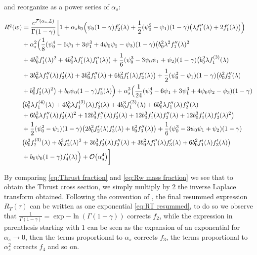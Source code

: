 \documentclass[../main.tex]{subfiles}
\begin{document}
and reorganize as a power series of $\alpha_s$:

\begin{equation}
    \begin{split}
        R^q(w) &= \frac{e^{\mathcal{F}(\alpha_s,L)}}{\Gamma(1-\gamma)} \biggl[ 1 + \alpha_s b_0 \Bigl( \psi_0(1-\gamma) f_2'(\lambda )  + \frac{1}{2} (\psi_0^2-\psi_1)(1-\gamma)\bigl( \lambda  f_1''(\lambda ) +2  f_1'(\lambda )\bigr)\Bigr)\\
        &+ \alpha_s^2 \Bigl(\frac{1}{8} (\psi_0^4 -6 \psi_1 + 3\psi_1^3 +4\psi_0\psi_2 -\psi_3)(1-\gamma) \bigl(b_0^2 \lambda ^2 f_1''(\lambda )^2\\
        &+4 b_0^2 f_1'(\lambda )^2 +4 b_0^2 \lambda  f_1'(\lambda ) f_1''(\lambda )\bigr)+\frac{1}{6} (\psi_0^3 -3 \psi_0\psi_1+\psi_2)(1-\gamma) \bigl(b_0^2 \lambda  f_1^{(3)}(\lambda )\\
        &+ 3 b_0^2 \lambda  f_1''(\lambda ) f_2'(\lambda )+3 b_0^2 f_1''(\lambda )+6 b_0^2 f_1'(\lambda ) f_2'(\lambda )\bigr)+\frac{1}{2} (\psi_0^2-\psi_1)(1-\gamma) \bigl(b_0^2 f_2''(\lambda )\\
        &+b_0^2 f_2'(\lambda )^2\bigr) + b_0 \psi_0(1-\gamma) f_3'(\lambda )\Bigr) + \alpha_s^3 \Bigl(\frac{1}{24} (\psi_0^4 -6 \psi_1 + 3\psi_1^3 +4\psi_0\psi_2 -\psi_3)(1-\gamma) \\
        &\bigl(b_0^3 \lambda  f_1^{(4)}(\lambda ) +4 b_0^3 \lambda  f_1^{(3)}(\lambda ) f_2'(\lambda ) + 4 b_0^3 f_1^{(3)}(\lambda )+6 b_0^3 \lambda  f_1''(\lambda ) f_2''(\lambda ) \\
        &+ 6 b_0^3 \lambda  f_1''(\lambda ) f_2'(\lambda )^2 +12 b_0^3 f_1''(\lambda ) f_2'(\lambda )+12 b_0^3 f_1'(\lambda ) f_2''(\lambda ) + 12 b_0^3 f_1'(\lambda ) f_2'(\lambda )^2\bigr) \\
        &+ \frac{1}{2} (\psi_0^2-\psi_1)(1-\gamma) \bigl(2 b_0^2 f_2'(\lambda ) f_3'(\lambda )+b_0^2 f_3''(\lambda )\bigr) + \frac{1}{6} (\psi_0^3 -3 \psi_0\psi_1+\psi_2)(1-\gamma) \\
        &\bigl(b_0^3 f_2^{(3)}(\lambda )+b_0^3 f_2'(\lambda )^3 +3 b_0^3 f_2'(\lambda ) f_2''(\lambda )+3 b_0^2 \lambda  f_1''(\lambda ) f_3'(\lambda ) +6 b_0^2 f_1'(\lambda ) f_3'(\lambda )\bigr)\\
        &+ b_0 \psi_0(1-\gamma) f_4'(\lambda ) \Bigr) + \order{\alpha_s^4} \biggr]
    \end{split}
\end{equation}

By comparing \cref{eq:Thrust fraction} and \cref{eq:Rw mass fraction} we see that to obtain the Thrust cross section, we simply multiply by 2 the inverse Laplace transform obtained.
Following the convention of \cite{CATANI19933}, the final resummed expression $R_T(\tau)$ can be written as one exponential \cref{eq:RT resummed}, to do so we 
observe that $\frac{1}{\Gamma(1-\gamma)}= \exp{-\ln(\Gamma(1-\gamma))}$ corrects $f_2$, while the expression in parenthesis starting with 1 can be seen as the expansion of an exponential 
for $\alpha_s \to 0$, then the terms proportional to $\alpha_s$ corrects $f_3$, the terms proportional to $\alpha_s^2$ corrects $f_4$ and so on.
\end{document}
